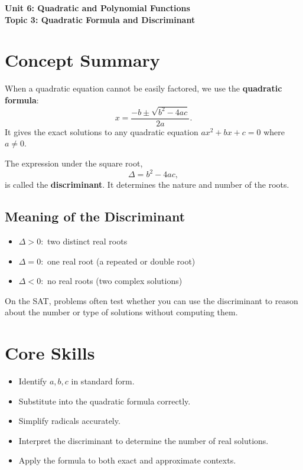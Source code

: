 \documentclass[12pt]{article}
\begin{document}
\begin{center}
    \LARGE \textbf{Unit 6: Quadratic and Polynomial Functions} \\[6pt]
    \Large \textbf{Topic 3: Quadratic Formula and Discriminant}
\end{center}

\vspace{1em}

\section*{Concept Summary}

When a quadratic equation cannot be easily factored, we use the \textbf{quadratic formula}:
\[
x = \frac{-b \pm \sqrt{b^2 - 4ac}}{2a}.
\]
It gives the exact solutions to any quadratic equation \(ax^2 + bx + c = 0\) where \(a \ne 0\).

The expression under the square root,
\[
\Delta = b^2 - 4ac,
\]
is called the \textbf{discriminant}. It determines the nature and number of the roots.

\subsection*{Meaning of the Discriminant}
\begin{itemize}
  \item \(\Delta > 0:\) two distinct real roots
  \item \(\Delta = 0:\) one real root (a repeated or double root)
  \item \(\Delta < 0:\) no real roots (two complex solutions)
\end{itemize}

On the SAT, problems often test whether you can use the discriminant to reason about the number or type of solutions without computing them.

\section*{Core Skills}
\begin{itemize}
  \item Identify \(a, b, c\) in standard form.
  \item Substitute into the quadratic formula correctly.
  \item Simplify radicals accurately.
  \item Interpret the discriminant to determine the number of real solutions.
  \item Apply the formula to both exact and approximate contexts.
\end{itemize}
\end{document}
